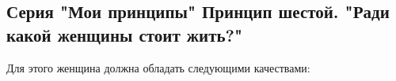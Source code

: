  
 
 

\subsection{Серия "Мои принципы" Принцип шестой. "Ради какой женщины стоит жить?"}
\label{sec:10_11_2020.fb.denis_zharkih.3.moi_principy}

Для этого женщина должна обладать следующими качествами:

